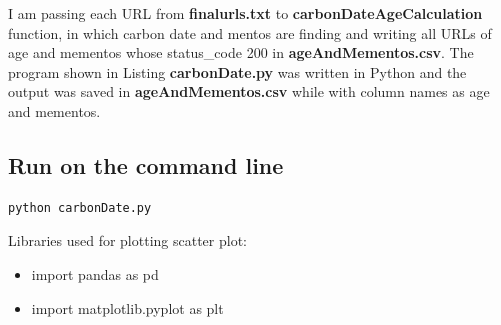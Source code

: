 \documentclass[letterpaper,11pt]{article}
\begin{document}
I am passing each URL from  \textbf{finalurls.txt} to  \textbf{carbonDateAgeCalculation} function, in which carbon date and mentos are finding and writing  all URLs of age and mementos whose status_code 200 in \textbf{ageAndMementos.csv}. The program shown in Listing \textbf{carbonDate.py} was written in Python and the output was saved in \textbf{ageAndMementos.csv} while with column names as age and mementos.
 \subsection*{Run on the command line}
\begin{lstlisting}[frame=single]
python carbonDate.py
\end{lstlisting}

Libraries used for plotting scatter plot:
\begin{itemize}
  \item import pandas as pd
  \item import matplotlib.pyplot as plt
\end{itemize}
\end{document}
